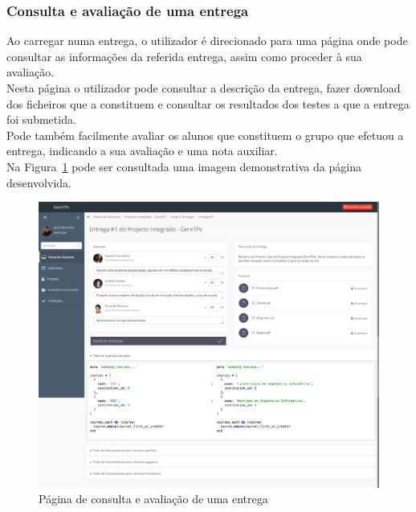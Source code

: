 \subsubsection{Consulta e avaliação de uma entrega}
\label{ssub:entrega_avaliacao}

Ao carregar numa entrega, o utilizador é direcionado para uma página onde pode consultar as informações da referida entrega, assim como proceder à sua avaliação.\\

Nesta página o utilizador pode consultar a descrição da entrega, fazer download dos ficheiros que a constituem e consultar os resultados dos testes a que a entrega foi submetida.\\

Pode também facilmente avaliar os alunos que constituem o grupo que efetuou a entrega, indicando a sua avaliação e uma nota auxiliar.\\

Na Figura~\ref{fig:delivery_grades} pode ser consultada uma imagem demonstrativa da página desenvolvida.

\begin{figure}[H]
  \centering
  \includegraphics[width=1\textwidth,center]{images/implementacao/docentes/delivery_and_grades}
  \caption{Página de consulta e avaliação de uma entrega}
  \label{fig:delivery_grades}
\end{figure}
